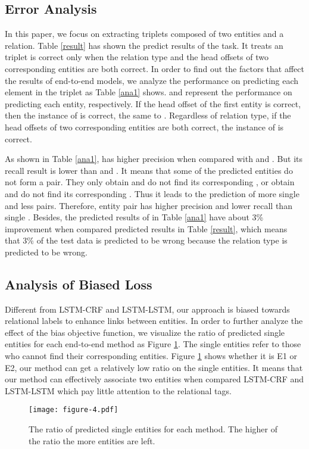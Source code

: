 \documentclass[11pt,a4paper]{article}
\begin{document}
\subsection{Error Analysis}
In this paper, we focus on extracting triplets composed of two entities and a relation.
Table \ref{result} has shown the predict results of the task. It treats an triplet is correct only when the relation type and
the head offsets of two corresponding entities are both correct.
In order to find out the factors that affect the results of end-to-end models,
we analyze the performance on predicting each element in the triplet as Table \ref{ana1} shows.
 and  represent the performance on predicting each entity, respectively.
If the head offset of the first entity is correct, then the instance of  is correct, the same to .
Regardless of relation type, if the head offsets of two corresponding entities are both correct,  the instance of  is correct.

As shown in Table \ref{ana1},  has higher precision when compared with  and .
But its recall result is lower than  and .
It means that some of the predicted entities do not form a pair.
They only obtain  and do not find its corresponding ,
or obtain  and do not find its corresponding .
Thus it leads to the prediction of more single  and less  pairs.
Therefore, entity pair  has higher precision and lower recall than single .
Besides, the predicted results of  in Table \ref{ana1} have about 3\% improvement when compared predicted results in Table \ref{result}, which means that 3\% of the test data is predicted to be wrong
because the relation type is predicted to be wrong.
\subsection{Analysis of Biased Loss}
Different from LSTM-CRF and LSTM-LSTM,
our approach is biased towards relational labels to enhance links between entities.
In order to further analyze the effect of the bias objective function,
we visualize the ratio of predicted single entities for each end-to-end method as Figure \ref{singlee}.
The single entities refer to those who cannot find their corresponding entities.
Figure \ref{singlee} shows whether it is E1 or E2, our method can get a relatively low ratio on the single entities.
It means that our method can effectively associate two entities when compared LSTM-CRF and LSTM-LSTM which pay little attention to
the relational tags.
\begin{figure}[h]
 \begin{center}
\texttt{[image: figure-4.pdf]}
\caption{\label{singlee}The ratio of predicted single entities for each method.
The higher of the ratio the more entities are left.}
 \end{center}
\end{figure}
\end{document}
